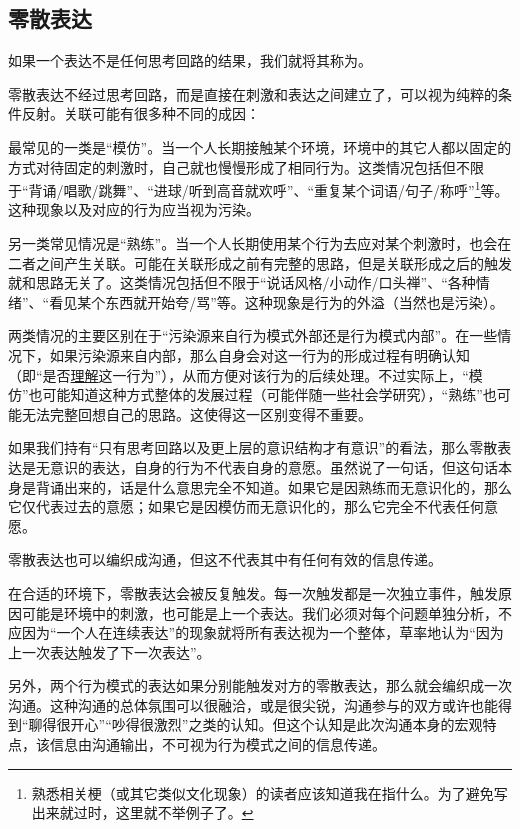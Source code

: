 \subsection{零散表达}
\noindent 如果一个表达不是任何思考回路的结果，我们就将其称为。
\begin{explain}
零散表达不经过思考回路，而是直接在刺激和表达之间建立了，可以视为纯粹的条件反射。关联可能有很多种不同的成因：

最常见的一类是“模仿”。当一个人长期接触某个环境，环境中的其它人都以固定的方式对待固定的刺激时，自己就也慢慢形成了相同行为。这类情况包括但不限于“背诵/唱歌/跳舞”、“进球/听到高音就欢呼”、“重复某个词语/句子/称呼”\footnote{熟悉相关梗（或其它类似文化现象）的读者应该知道我在指什么。为了避免写出来就过时，这里就不举例子了。}等。这种现象以及对应的行为应当视为污染。

另一类常见情况是“熟练”。当一个人长期使用某个行为去应对某个刺激时，也会在二者之间产生关联。可能在关联形成之前有完整的思路，但是关联形成之后的触发就和思路无关了。这类情况包括但不限于“说话风格/小动作/口头禅”、“各种情绪”、“看见某个东西就开始夸/骂”等。这种现象是行为的外溢（当然也是污染）。

两类情况的主要区别在于“污染源来自行为模式外部还是行为模式内部”。在一些情况下，如果污染源来自内部，那么自身会对这一行为的形成过程有明确认知（即“是否\hyperref[def:理解行为]{理解}这一行为”），从而方便对该行为的后续处理。不过实际上，“模仿”也可能知道这种方式整体的发展过程（可能伴随一些社会学研究），“熟练”也可能无法完整回想自己的思路。这使得这一区别变得不重要。

如果我们持有“只有思考回路以及更上层的意识结构才有意识”的看法，那么零散表达是无意识的表达，自身的行为不代表自身的意愿。虽然说了一句话，但这句话本身是背诵出来的，话是什么意思完全不知道。如果它是因熟练而无意识化的，那么它仅代表过去的意愿；如果它是因模仿而无意识化的，那么它完全不代表任何意愿。
\end{explain}
零散表达也可以编织成沟通，但这不代表其中有任何有效的信息传递。
\begin{explain}
在合适的环境下，零散表达会被反复触发。每一次触发都是一次独立事件，触发原因可能是环境中的刺激，也可能是上一个表达。我们必须对每个问题单独分析，不应因为“一个人在连续表达”的现象就将所有表达视为一个整体，草率地认为“因为上一次表达触发了下一次表达”。

另外，两个行为模式的表达如果分别能触发对方的零散表达，那么就会编织成一次沟通。这种沟通的总体氛围可以很融洽，或是很尖锐，沟通参与的双方或许也能得到“聊得很开心”“吵得很激烈”之类的认知。但这个认知是此次沟通本身的宏观特点，该信息由沟通输出，不可视为行为模式之间的信息传递。
\end{explain}

